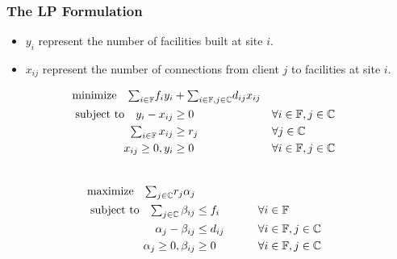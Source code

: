 \documentclass[hyperref, xcolor=dvipsnames]{beamer}
\begin{document}
\begin{frame}
  \frametitle{The LP Formulation}
  \begin{itemize}
  \item $y_i$ represent the number of facilities built at site $i$.
  \item $x_{ij}$ represent the number of connections from client $j$
    to facilities at site $i$.
  \end{itemize}
\begin{alignat}{3}
  \textrm{minimize}\quad \textstyle{\sum_{i\in \mathbb{F}}}f_iy_i &+ \textstyle{\sum_{i\in \mathbb{F}, j\in \mathbb{C}}}d_{ij}x_{ij}&\label{eqn:fac_primal}
  									\\ \notag
  \textrm{subject to}\quad y_i - x_{ij} &\geq 0  & &\forall i\in \mathbb{F}, j\in \mathbb{C} 
									\\ \notag
     \textstyle{\sum_{i\in \mathbb{F}} x_{ij}} &\geq r_j & &\forall j\in \mathbb{C}
 									\\ \notag
  	  x_{ij} \geq 0, y_i &\geq 0 & &\forall i\in \mathbb{F}, j\in \mathbb{C} 
  									\\ \notag
\end{alignat}


\begin{alignat}{3}
  \textrm{maximize}\quad \textstyle{\sum_{j\in \mathbb{C}}} r_j\alpha_j&\label{eqn:fac_dual}  
     						\\ \notag
  \textrm{subject to} \quad \textstyle{
    \sum_{j\in \mathbb{C}}\beta_{ij}} &\leq f_i  &\quad\quad			&\forall i \in \mathbb{F}  
							\\ \notag
  \alpha_{j} - \beta_{ij} 	&\leq  d_{ij}       &                 & \forall i\in \mathbb{F}, j\in \mathbb{C} 
							\\ \notag
  \alpha_j \geq 0, \beta_{ij} &\geq 0           &            & \forall i\in \mathbb{F}, j\in \mathbb{C}
\end{alignat}

\end{frame}
\end{document}

